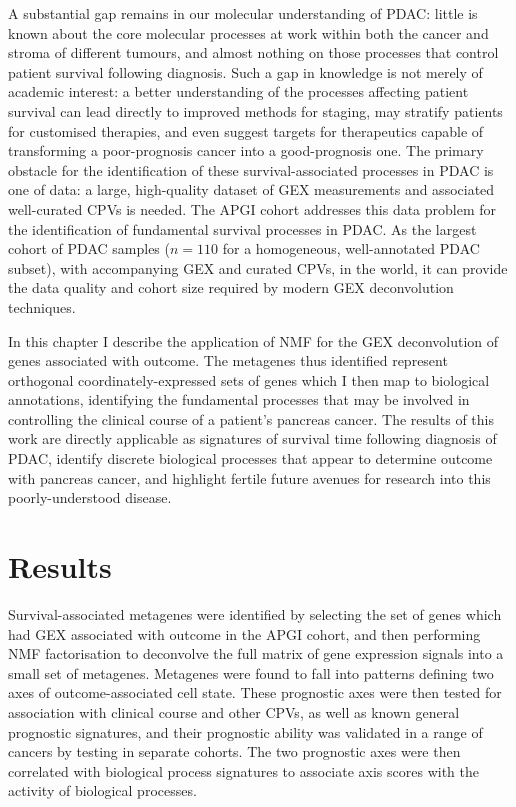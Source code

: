 \documentclass[dissertation.tex]{subfiles}
\begin{document}
A substantial gap remains in our molecular understanding of \gls{PDAC}: little is known about the core molecular processes at work within both the cancer and stroma of different tumours, and almost nothing on those processes that control patient survival following diagnosis.  Such a gap in knowledge is not merely of academic interest: a better understanding of the processes affecting patient survival can lead directly to improved methods for staging, may stratify patients for customised therapies, and even suggest targets for therapeutics capable of transforming a poor-prognosis cancer into a good-prognosis one.  The primary obstacle for the identification of these survival-associated processes in \gls{PDAC} is one of data: a large, high-quality dataset of \gls{GEX} measurements and associated well-curated \glspl{CPV} is needed.  The \gls{APGI} cohort addresses this data problem for the identification of fundamental survival processes in \gls{PDAC}.  As the largest cohort of \gls{PDAC} samples ($n = 110$ for a homogeneous, well-annotated \gls{PDAC} subset), with accompanying \gls{GEX} and curated \glspl{CPV}, in the world, it can provide the data quality and cohort size required by modern \gls{GEX} deconvolution techniques.

In this chapter I describe the application of \gls{NMF} for the \gls{GEX} deconvolution of genes associated with outcome.  The metagenes thus identified represent orthogonal coordinately-expressed sets of genes which I then map to biological annotations, identifying the fundamental processes that may be involved in controlling the clinical course of a patient's pancreas cancer.  The results of this work are directly applicable as signatures of survival time following diagnosis of \gls{PDAC}, identify discrete biological processes that appear to determine outcome with pancreas cancer, and highlight fertile future avenues for research into this poorly-understood disease.


\section{Results}

Survival-associated metagenes were identified by selecting the set of genes which had \gls{GEX} associated with outcome in the \gls{APGI} cohort, and then performing \gls{NMF} factorisation to deconvolve the full matrix of gene expression signals into a small set of metagenes.  Metagenes were found to fall into patterns defining two axes of outcome-associated cell state.  These prognostic axes were then tested for association with clinical course and other \glspl{CPV}, as well as known general prognostic signatures, and their prognostic ability was validated in a range of cancers by testing in separate cohorts.  The two prognostic axes were then correlated with biological process signatures to associate axis scores with the activity of biological processes.
\end{document}
